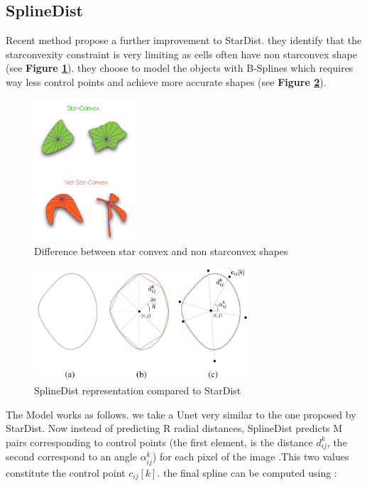 \documentclass[main.tex]{subfiles}
\begin{document}
\subsection{SplineDist}
Recent method \cite{Mandal2020} propose a further improvement to StarDist. they identify that the starconvexity constraint is very limiting as cells often have non starconvex shape (see \textbf{Figure \ref{fig:starxonvex}}). they choose to model the objects with B-Splines which requires way less control points and achieve more accurate shapes (see \textbf{Figure \ref{fig:splineangles}}).

\begin{figure}[H]
    \centering
    \includegraphics[width=4cm]{images/starconvex.png}
    \caption{Difference between star convex and non starconvex shapes}
    \label{fig:starxonvex}
\end{figure}

\begin{figure}[H]
    \centering
    \includegraphics[width=8cm]{images/splinevsstarangles.png}
    \caption{SplineDist representation compared to StarDist}
    \label{fig:splineangles}
\end{figure}

The Model works as follows. we take a Unet very similar to the one proposed by StarDist. Now instead of predicting R radial distances, SplineDist predicts M pairs corresponding to control points (the first element, is the distance $d_{ij}^{k}$, the second correspond to an angle $\alpha_{ij}^{k}$) for each pixel of the image .This two values constitute the control point $c_{ij}[k]$. the final spline can be computed using :
\end{document}
